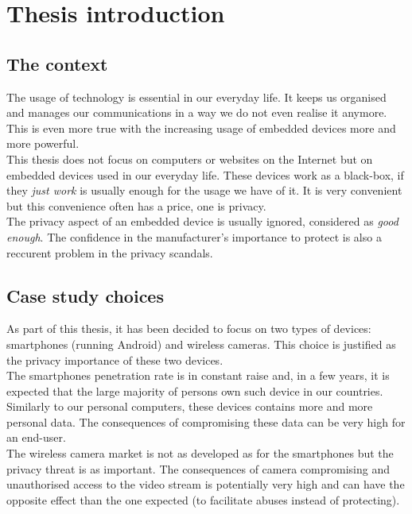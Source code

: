 \chapter{Thesis introduction}

\section{The context}

The usage of technology is essential in our everyday life.
It keeps us organised and manages our communications in a way we do not even realise it anymore.
This is even more true with the increasing usage of embedded devices more and more powerful.\\

This thesis does not focus on computers or websites on the Internet but on embedded devices used in our everyday life.
These devices work as a black-box, if they \emph{just work} is usually enough for the usage we have of it.
It is very convenient but this convenience often has a price, one is privacy.\\

The privacy aspect of an embedded device is usually ignored, considered as \emph{good enough}.
The confidence in the manufacturer's importance to protect is also a reccurent problem in the privacy scandals.\\


\section{Case study choices}

As part of this thesis, it has been decided to focus on two types of devices: smartphones (running Android) and wireless cameras.
This choice is justified as the privacy importance of these two devices.\\

The smartphones penetration rate is in constant raise and, in a few years, it is expected that the large majority of persons own such device in our countries.
Similarly to our personal computers, these devices contains more and more personal data.
The consequences of compromising these data can be very high for an end-user.\\

The wireless camera market is not as developed as for the smartphones but the privacy threat is as important.
The consequences of camera compromising and unauthorised access to the video stream is potentially very high and can have the opposite effect than the one expected (to facilitate abuses instead of protecting).\\

